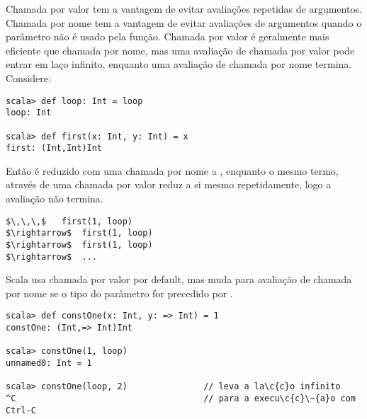 Chamada por valor tem a vantagem de evitar avalia\c{c}\~{o}es repetidas de argumentos.
Chamada por nome tem a vantagem de evitar avalia\c{c}\~{o}es de argumentos quando o 
par\^{a}metro n\~{a}o \'{e} usado pela fun\c{c}\~{a}o. Chamada por valor \'{e} geralmente mais 
eficiente que chamada por nome, mas uma avalia\c{c}\~{a}o de chamada por valor
pode entrar em la\c{c}o infinito, enquanto uma avalia\c{c}\~{a}o de chamada por nome 
termina. Considere: 
\begin{lstlisting}
scala> def loop: Int = loop
loop: Int

scala> def first(x: Int, y: Int) = x
first: (Int,Int)Int
\end{lstlisting}
Ent\~{a}o  \'{e} reduzido com uma chamada por nome a ,
enquanto o mesmo termo, atrav\'{e}s de uma chamada por valor reduz a si mesmo 
repetidamente, logo a avalia\c{c}\~{a}o n\~{a}o termina.  
\begin{lstlisting}
$\,\,\,$   first(1, loop)
$\rightarrow$  first(1, loop)
$\rightarrow$  first(1, loop)
$\rightarrow$  ...
\end{lstlisting}
Scala usa chamada por valor por default, mas muda para avalia\c{c}\~{a}o de chamada por nome 
se o tipo do par\^{a}metro for precedido por \code{=>}. 
\example\ 
 
\begin{lstlisting}
scala> def constOne(x: Int, y: => Int) = 1
constOne: (Int,=> Int)Int

scala> constOne(1, loop)
unnamed0: Int = 1

scala> constOne(loop, 2)               // leva a la\c{c}o infinito
^C                                     // para a execu\c{c}\~{a}o com Ctrl-C
\end{lstlisting}

